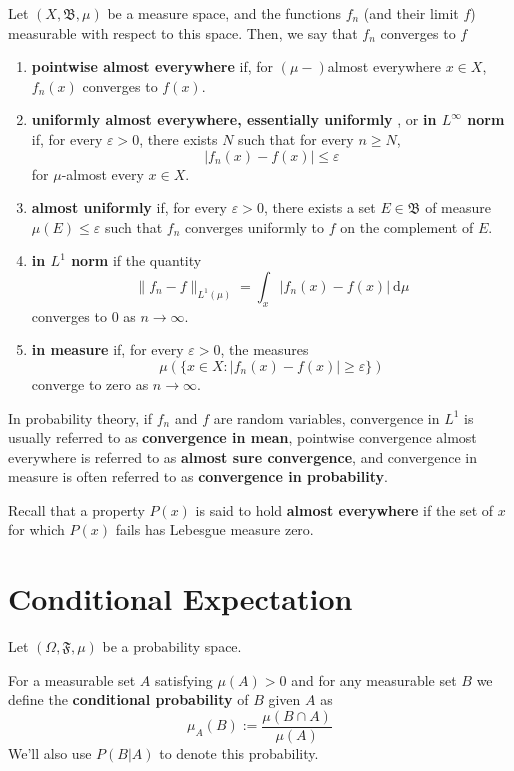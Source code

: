 Let $(X, \mathfrak{B}, \mu)$ be a measure space, and the functions $f_n$ (and their limit $f$) measurable with respect to this space. Then, we say that $f_n$ converges to $f$
\begin{enumerate}
	\item \textbf{pointwise almost everywhere} if, for $(\mu-)$almost everywhere $x \in X$, $f_n(x)$ converges to $f(x)$.
	\item \textbf{uniformly almost everywhere, essentially uniformly} , or \textbf{in $L^\infty$ norm} if, for every $\varepsilon > 0$, there exists $N$ such that for every $n \geq N$, \[ |f_n(x) - f(x)| \leq \varepsilon \] for $\mu$-almost every $x \in X$.
	\item \textbf{almost uniformly} if, for every $\varepsilon > 0$, there exists a set $E \in \mathfrak{B}$ of measure $\mu(E) \leq \varepsilon$ such that $f_n$ converges uniformly to $f$ on the complement of $E$.
	\item \textbf{in $L^1$ norm} if the quantity \[ \| f_n - f \|_{L^1(\mu)} = \int_x |f_n(x) - f(x)| ~\mathrm{d}\mu \] converges to $0$ as $n \to \infty$.
	\item \textbf{in measure} if, for every $\varepsilon > 0$, the measures \[ \mu (\{ x \in X : | f_n(x) - f(x) | \geq \varepsilon \}) \] converge to zero as $n \to \infty$.
\end{enumerate}

In probability theory, if $f_n$ and $f$ are random variables, convergence in $L^1$ is usually referred to as \textbf{convergence in mean}, pointwise convergence almost everywhere is referred to as \textbf{almost sure convergence}, and convergence in measure is often referred to as \textbf{convergence in probability}.

Recall that a property $P(x)$ is said to hold \textbf{almost everywhere} if the set of $x$ for which $P(x)$ fails has Lebesgue measure zero.

\section{Conditional Expectation}

Let $(\Omega, \mathfrak{F}, \mu)$ be a probability space.

\begin{definition}
For a measurable set $A$ satisfying $\mu(A) > 0$ and for any measurable set $B$ we define the \textbf{conditional probability} of $B$ given $A$ as
\[
	\mu_A(B) := \frac{\mu(B \cap A)}{\mu(A)} 
\]
We'll also use $P(B | A)$ to denote this probability.
\end{definition}

